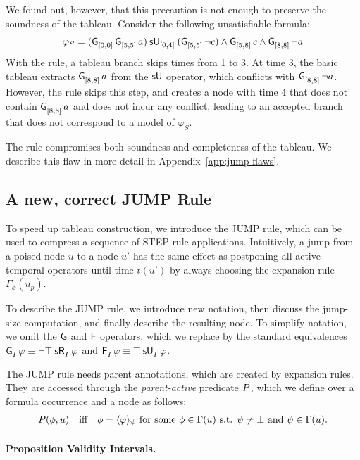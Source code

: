 \documentclass{easychair}
\begin{document}
We found out, however, that this precaution is not enough to preserve the soundness of the tableau.
Consider the following unsatisfiable formula:
\[
\varphi_S =
\suntil{[0,4]}{(\glob{[0,0]} \glob{[5,5]} a)}{(\glob{[5,5]} \neg c)} \land \glob{[5,8]} c \land \glob{[8,8]} \neg a
\]
With the \oldjump{} rule, a tableau branch skips times from 1 to 3.
At time 3, the basic tableau extracts $\glob{[8,8]} a$ from the $\suntilop$ operator, which conflicts with $\glob{[8,8]} \neg a$.
However, the \oldjump{} rule skips this step, and creates a node with time 4 that does not contain $\glob{[8,8]} a$ and does not incur any conflict, leading to an accepted branch that does not correspond to a model of $\varphi_S$.

The \oldjump{} rule compromises both soundness and completeness of the tableau.
We describe this flaw in more detail in Appendix~\ref{app:jump-flaws}.

\subsection{A new, correct \textsf{JUMP} Rule}
\label{sec:jump}

To speed up tableau construction, we introduce the \textsf{JUMP} rule, which can be used to compress a sequence of \textsf{STEP} rule applications.
Intuitively, a jump from a poised node $u$ to a node $u'$ has the same effect as postponing all active temporal operators until time $t(u')$ by always choosing the expansion rule $\Gamma_{\phi}(u_p)$.

To describe the \textsf{JUMP} rule, we introduce new notation, then discuss the jump-size computation, and finally describe the resulting node. 
%
To simplify notation, we omit the $\globop$ and $\evenop$ operators, which we replace by the standard equivalences $\glob{I}\varphi \equiv \srelease{I}{\neg\top}{\varphi}$ and $\even{I}\varphi \equiv \suntil{I}{\top}{\varphi}$.

The \textsf{JUMP} rule needs parent annotations, which are created by expansion rules.
They are accessed through the \emph{parent-active} predicate $\pactive$, which we define over a formula occurrence and a node as follows:
\begin{align*}
    \pactive(\phi,u)
    \quad\text{iff}\quad
    \phi = \parof{\varphi}{\psi}
    \text{ for some } \phi \in \Gamma(u)
    \text{ s.t. } \psi \neq \bot
    \text{ and }
    \psi \in \Gamma(u).
\end{align*}


\paragraph{Proposition Validity Intervals.}
\end{document}
